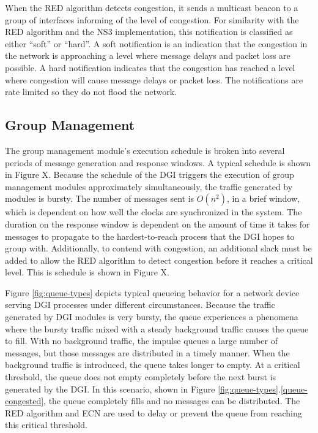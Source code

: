 When the \ac{RED} algorithm detects congestion, it sends a multicast beacon to a group of interfaces informing of the level of congestion.
For similarity with the \ac{RED} algorithm and the \ac{NS3} implementation, this notification is classified as either ``soft'' or ``hard''.
A soft notification is an indication that the congestion in the network is approaching a level where message delays and packet loss are possible.
A hard notification indicates that the congestion has reached a level where congestion will cause message delays or packet loss.
The notifications are rate limited so they do not flood the network.

\subsection{Group Management}

The group management module's execution schedule is broken into several periods of message generation and response windows.
A typical schedule is shown in Figure X.
Because the schedule of the \ac{DGI} triggers the execution of group management modules approximately simultaneously, the traffic generated by modules is bursty.
The number of messages sent is $O(n^2)$, in a brief window, which is dependent on how well the clocks are synchronized in the system.
The duration on the response window is dependent on the amount of time it takes for messages to propagate to the hardest-to-reach process that the \ac{DGI} hopes to group with.
Additionally, to contend with congestion, an additional slack must be added to allow the \ac{RED} algorithm to detect congestion before it reaches a critical level.
This is schedule is shown in Figure X.

Figure \ref{fig:queue-types} depicts typical queueing behavior for a network device serving \ac{DGI} processes under different circumstances.
Because the traffic generated by \ac{DGI} modules is very bursty, the queue experiences a phenomena where the bursty traffic mixed with a steady background traffic causes the queue to fill.
With no background traffic, the impulse queues a large number of messages, but those messages are distributed in a timely manner.
When the background traffic is introduced, the queue takes longer to empty.
At a critical threshold, the queue does not empty completely before the next burst is generated by the \ac{DGI}.
In this scenario, shown in Figure \ref{fig:queue-types}.\ref{queue-congested}, the queue completely fills and no messages can be distributed.
The \ac{RED} algorithm and \ac{ECN} are used to delay or prevent the queue from reaching this critical threshold.

